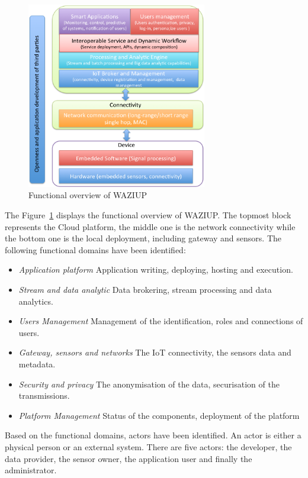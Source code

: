 \begin{figure}[h!]
\centering
\includegraphics[width=0.7\textwidth]{figs/functional.png}
\caption{Functional overview of WAZIUP}
\label{fig:func}
\end{figure}

The Figure~\ref{fig:func} displays the functional overview of WAZIUP.
The topmost block represents the Cloud platform, the middle one is the network connectivity while the bottom one is the local deployment, including gateway and sensors.
The following functional domains have been identified:

\begin{itemize}
  \item \emph{Application platform}
	Application writing, deploying, hosting and execution.
  \item \emph{Stream and data analytic}
	Data brokering, stream processing and data analytics.
  \item \emph{Users Management}
	Management of the identification, roles and connections of users.
  \item \emph{Gateway, sensors and networks}
	The IoT connectivity, the sensors data and metadata.
  \item \emph{Security and privacy}
	The anonymisation of the data, securisation of the transmissions.
  \item \emph{Platform Management}
	Status of the components, deployment of the platform
\end{itemize}

Based on the functional domains, actors have been identified. 
An actor is either a physical person or an external system. 
There are five actors: the developer, the data provider, the sensor owner, the application user and finally the administrator.

